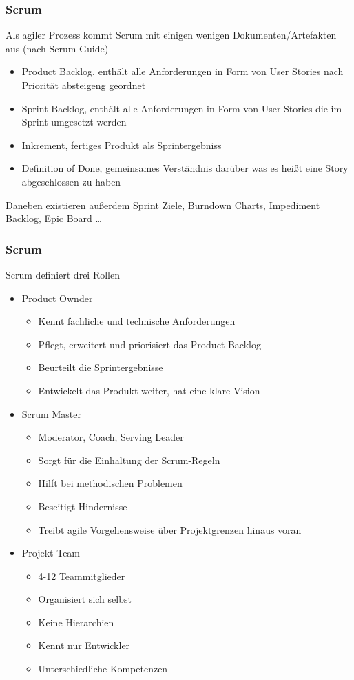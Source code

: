 \begin{frame}
\frametitle{Scrum}
	Als agiler Prozess kommt Scrum mit einigen wenigen Dokumenten/Artefakten aus (nach Scrum Guide)
	\begin{itemize}
		\item Product Backlog, enthält alle Anforderungen in Form von User Stories nach Priorität absteigeng geordnet
		\item Sprint Backlog, enthält alle Anforderungen in Form von User Stories die im Sprint umgesetzt werden
		\item Inkrement, fertiges Produkt als Sprintergebniss
		\item Definition of Done, gemeinsames Verständnis darüber was es heißt eine Story abgeschlossen zu haben
	\end{itemize}
	Daneben existieren außerdem Sprint Ziele, Burndown Charts, Impediment Backlog, Epic Board \ldots
\end{frame}

\begin{frame}
\frametitle{Scrum}
	Scrum definiert drei Rollen
	\begin{itemize}
		\item Product Ownder
			\begin{itemize}
				\item Kennt fachliche und technische Anforderungen
				\item Pflegt, erweitert und priorisiert das Product Backlog
				\item Beurteilt die Sprintergebnisse
				\item Entwickelt das Produkt weiter, hat eine klare Vision
			\end{itemize}
		\item Scrum Master
			\begin{itemize}
				\item Moderator, Coach, Serving Leader
				\item Sorgt für die Einhaltung der Scrum-Regeln
				\item Hilft bei methodischen Problemen
				\item Beseitigt Hindernisse
				\item Treibt agile Vorgehensweise über Projektgrenzen hinaus voran
			\end{itemize}
		\item Projekt Team
			\begin{itemize}
				\item 4-12 Teammitglieder
				\item Organisiert sich selbst
				\item Keine Hierarchien
				\item Kennt nur Entwickler
				\item Unterschiedliche Kompetenzen
			\end{itemize}
	\end{itemize}
\end{frame}

